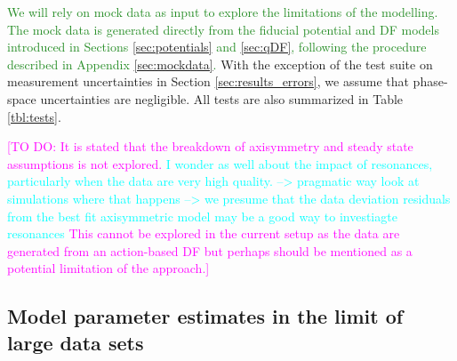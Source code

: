 \documentclass[iop,revtex4]{emulateapj}
\newcommand{\HW}[1]{\textcolor{Cyan}{#1}}
\newcommand{\NEW}[1]{\textcolor{ForestGreen}{#1}}
\newcommand{\Wilma}[1]{\textcolor{Magenta}{#1}}
\begin{document}
\NEW{We will rely on mock data as input to explore the limitations of the modelling. The mock data is generated directly from the fiducial potential and DF models introduced in Sections \ref{sec:potentials} and \ref{sec:qDF}, following the procedure described in Appendix \ref{sec:mockdata}.} With the exception of the test suite on measurement uncertainties in Section \ref{sec:results_errors}, we assume that phase-space uncertainties are negligible. All tests are also summarized in Table \ref{tbl:tests}. 

\Wilma{[TO DO: It is stated that the breakdown of axisymmetry and steady state assumptions is not explored. \HW{I wonder as well about the impact of resonances, particularly when the data are very high quality. --> pragmatic way look at simulations where that happens
--> we presume that the data deviation residuals from the best fit
axisymmetric model may be a good way to investiagte resonances
} This cannot be explored in the current setup as the data are generated from an action-based DF but perhaps should be mentioned as a potential limitation of the approach.]}

\subsection{Model parameter estimates in the limit of large data sets} \label{sec:largedata}
\end{document}
